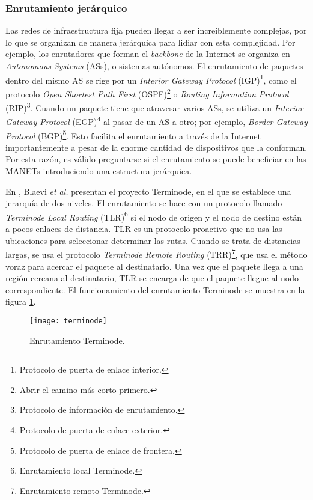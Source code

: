 \subsubsection{Enrutamiento jerárquico}
\label{subsubsec:enrutamiento_jerarquico}

Las redes de infraestructura fija pueden llegar a ser increíblemente complejas,
por lo que se organizan de manera jerárquica para lidiar con esta complejidad.
Por ejemplo, los enrutadores que forman el \textit{backbone} de la Internet se
organiza en \textit{Autonomous Systems} (ASs), o sistemas autónomos. El
enrutamiento de paquetes dentro del mismo AS se rige por un \textit{Interior
Gateway Protocol} (IGP)\footnote{Protocolo de puerta de enlace interior.}, como
el protocolo \textit{Open Shortest Path First} (OSPF)\footnote{Abrir el camino
más corto primero.} o \textit{Routing Information Protocol}
(RIP)\footnote{Protocolo de información de enrutamiento.}. Cuando un paquete
tiene que atravesar varios ASs, se utiliza un \textit{Interior Gateway Protocol}
(EGP)\footnote{Protocolo de puerta de enlace exterior.} al pasar de un AS a
otro; por ejemplo, \textit{Border Gateway Protocol} (BGP)\footnote{Protocolo
de puerta de enlace de frontera.}.
Esto facilita el enrutamiento a través de la Internet importantemente a pesar de
la enorme cantidad de dispositivos que la conforman. Por esta razón, es válido
preguntarse si el enrutamiento se puede beneficiar en las MANETs introduciendo
una estructura jerárquica.

En \cite{Blaevi2002}, Blaevi \textit{et al.} presentan el proyecto Terminode,
en el que se establece una jerarquía de dos niveles. El enrutamiento se hace
con un protocolo llamado \textit{Terminode Local Routing}
(TLR)\footnote{Enrutamiento local Terminode.} si el nodo de origen y el nodo de
destino están a pocos enlaces de distancia. TLR es un protocolo proactivo que
no usa las ubicaciones para seleccionar determinar las rutas. Cuando se trata
de distancias largas, se usa el protocolo \textit{Terminode Remote Routing}
(TRR)\footnote{Enrutamiento remoto Terminode.}, que usa el método voraz para
acercar el paquete al destinatario. Una vez que el paquete llega a una región
cercana al destinatario, TLR se encarga de que el paquete llegue al nodo
correspondiente. El funcionamiento del enrutamiento Terminode se muestra en la
figura \ref{fig:terminode}.

\begin{figure}[th]
\centering
\texttt{[image: terminode]}
\decoRule
\caption[Enrutamiento Terminode]{Enrutamiento Terminode.}
\label{fig:terminode}
\end{figure}

